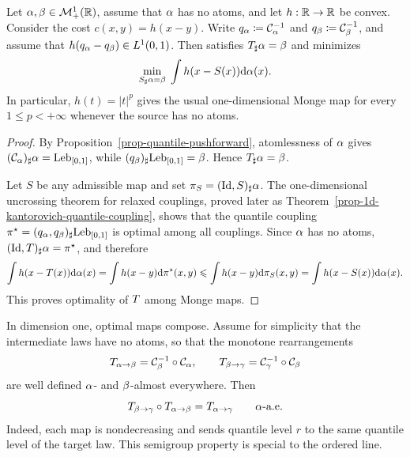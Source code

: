 \begin{thm}\label{prop-1d-quantile-map}
	Let $\alpha,\beta\in\mathcal{M}_+^1(\mathbb{R})$, assume that $\alpha$ has no atoms, and let $h:\mathbb{R}\to\mathbb{R}$ be convex. Consider the cost $c(x,y)=h(x-y)$. Write $q_\alpha\coloneqq\mathcal{C}_{\alpha}^{-1}$ and $q_\beta\coloneqq\mathcal{C}_{\beta}^{-1}$, and assume that $h(q_\alpha-q_\beta)\in L^1(0,1)$. Then
	satisfies $T_\sharp\alpha=\beta$ and minimizes
	\[
		\underset{S_\sharp\alpha=\beta}{\min}\;\int h(x-S(x))\mathrm{d}\alpha(x).
	\]
	In particular, $h(t)=|t|^p$ gives the usual one-dimensional Monge map for every $1\leq p<+\infty$ whenever the source has no atoms.
\end{thm}
\begin{proof}
	By Proposition~\ref{prop-quantile-pushforward}, atomlessness of $\alpha$ gives $(\mathcal{C}_{\alpha})_\sharp\alpha=\mathrm{Leb}_{[0,1]}$, while $(q_\beta)_\sharp\mathrm{Leb}_{[0,1]}=\beta$. Hence $T_\sharp\alpha=\beta$.

	Let $S$ be any admissible map and set $\pi_S=(\mathrm{Id},S)_\sharp\alpha$. The one-dimensional uncrossing theorem for relaxed couplings, proved later as Theorem~\ref{prop-1d-kantorovich-quantile-coupling}, shows that the quantile coupling $\pi^\star=(q_\alpha,q_\beta)_\sharp\mathrm{Leb}_{[0,1]}$ is optimal among all couplings. Since $\alpha$ has no atoms, $(\mathrm{Id},T)_\sharp\alpha=\pi^\star$, and therefore
	\[
		\int h(x-T(x))\mathrm{d}\alpha(x)
		=
		\int h(x-y)\mathrm{d}\pi^\star(x,y)
		\leqslant
		\int h(x-y)\mathrm{d}\pi_S(x,y)
		=
		\int h(x-S(x))\mathrm{d}\alpha(x).
	\]
	This proves optimality of $T$ among Monge maps.
\end{proof}

\begin{rem}\label{rem-1d-composition-optimal}
	In dimension one, optimal maps compose. Assume for simplicity that the intermediate laws have no atoms, so that the monotone rearrangements
	\[
		T_{\alpha\to\beta}=\mathcal{C}_{\beta}^{-1}\circ\mathcal{C}_{\alpha},
		\qquad
		T_{\beta\to\gamma}=\mathcal{C}_{\gamma}^{-1}\circ\mathcal{C}_{\beta}
	\]
	are well defined $\alpha$- and $\beta$-almost everywhere. Then
	\[
		T_{\beta\to\gamma}\circ T_{\alpha\to\beta}
		=
		T_{\alpha\to\gamma}
		\qquad \alpha\text{-a.e.}
	\]
	Indeed, each map is nondecreasing and sends quantile level $r$ to the same quantile level of the target law. This semigroup property is special to the ordered line.
\end{rem}

